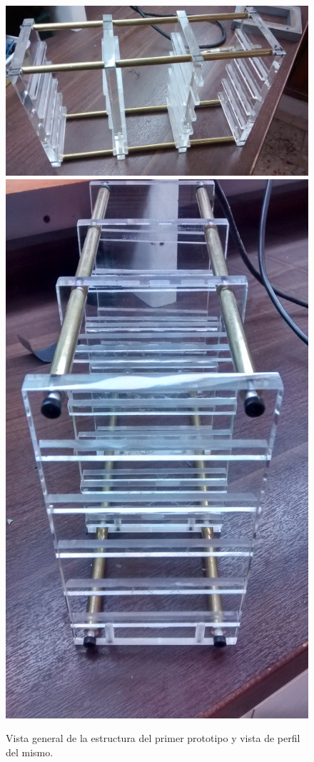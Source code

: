 \begin{figure}[H]
\centering
\includegraphics{Chapter5/Figures/prototipo1vistageneral}
\includegraphics{Chapter5/Figures/prototipo1vistaperfil}
\caption[Vista general del primer prototipo]{Vista general de la estructura del primer prototipo y vista de perfil del mismo.}
\end{figure}

